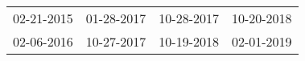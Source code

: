 \begin{supertabular}{llll}
 02-21-2015 &  01-28-2017 &  10-28-2017 &  10-20-2018 \\
 02-06-2016 &  10-27-2017 &  10-19-2018 &  02-01-2019 \\
\end{supertabular}
